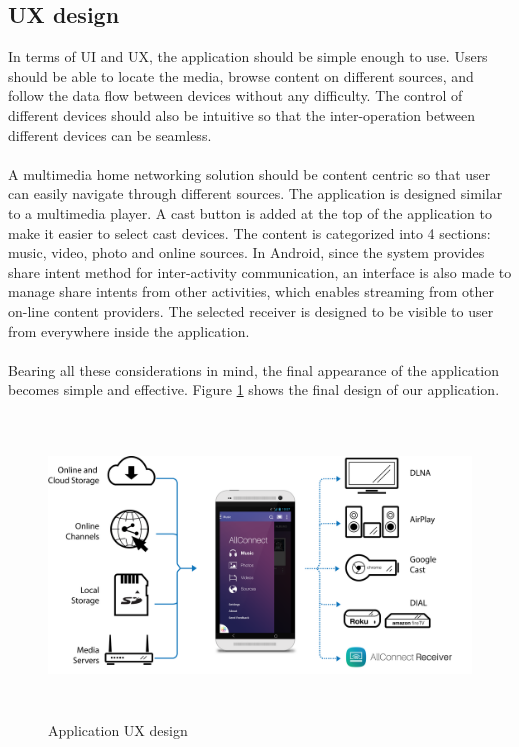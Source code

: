 \subsection{UX design}
In terms of UI and UX, the application should be simple enough to use. Users should be able to locate the media, browse
 content on different sources, and follow the data flow between devices without any difficulty. The control of different devices should also be intuitive so that the inter-operation between different devices can be seamless.\\
\\
A multimedia home networking solution should be content centric so that user can easily navigate through different sources. The application is designed similar to a multimedia player. A cast button is added at the top of the application to make it easier to select cast devices. The content is categorized into 4 sections: music, video, photo and online sources. In Android, since the system provides share intent method for inter-activity communication, an interface is also made to manage share intents from other activities, which enables streaming from other on-line content providers. The selected receiver is designed to be visible to user from everywhere inside the application. \\
\\
Bearing all these considerations in mind, the final appearance of the application becomes simple and effective. Figure \ref{chart5} shows the final design of our application.
\begin{figure}[htb]
\centering \includegraphics[height=8cm]{charts/allconnect-app}
\caption{Application UX design \label{chart5}}
\end{figure}

